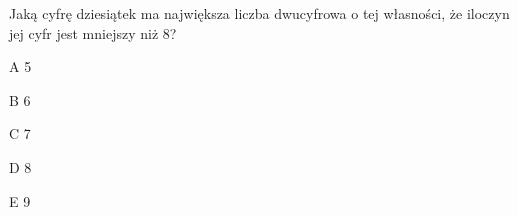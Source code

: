 \begin{tresc}
Jaką cyfrę dziesiątek ma największa liczba dwucyfrowa o tej własności, że iloczyn jej cyfr jest mniejszy niż 8?
\end{tresc}
\begin{wariant}{A} 5 \end{wariant}
\begin{wariant}{B} 6 \end{wariant}
\begin{wariant}{C} 7 \end{wariant}
\begin{wariant}{D} 8 \end{wariant}
\begin{wariant}{E} 9 \end{wariant}
